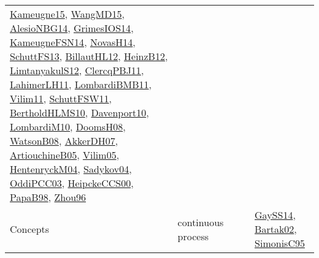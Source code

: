 {\begin{longtable}{llp{6cm}p{6cm}p{6cm}}
\href{articles/Kameugne15.pdf}{Kameugne15}\cite{Kameugne15}, \href{articles/WangMD15.pdf}{WangMD15}\cite{WangMD15}, \href{papers/AlesioNBG14.pdf}{AlesioNBG14}\cite{AlesioNBG14}, \href{articles/GrimesIOS14.pdf}{GrimesIOS14}\cite{GrimesIOS14}, \href{articles/KameugneFSN14.pdf}{KameugneFSN14}\cite{KameugneFSN14}, \href{articles/NovasH14.pdf}{NovasH14}\cite{NovasH14}, \href{papers/SchuttFS13.pdf}{SchuttFS13}\cite{SchuttFS13}, \href{papers/BillautHL12.pdf}{BillautHL12}\cite{BillautHL12}, \href{papers/HeinzB12.pdf}{HeinzB12}\cite{HeinzB12}, \href{articles/LimtanyakulS12.pdf}{LimtanyakulS12}\cite{LimtanyakulS12}, \href{papers/ClercqPBJ11.pdf}{ClercqPBJ11}\cite{ClercqPBJ11}, \href{papers/LahimerLH11.pdf}{LahimerLH11}\cite{LahimerLH11}, \href{papers/LombardiBMB11.pdf}{LombardiBMB11}\cite{LombardiBMB11}, \href{papers/Vilim11.pdf}{Vilim11}\cite{Vilim11}, \href{articles/SchuttFSW11.pdf}{SchuttFSW11}\cite{SchuttFSW11}, \href{papers/BertholdHLMS10.pdf}{BertholdHLMS10}\cite{BertholdHLMS10}, \href{papers/Davenport10.pdf}{Davenport10}\cite{Davenport10}, \href{papers/LombardiM10.pdf}{LombardiM10}\cite{LombardiM10}, \href{papers/DoomsH08.pdf}{DoomsH08}\cite{DoomsH08}, \href{papers/WatsonB08.pdf}{WatsonB08}\cite{WatsonB08}, \href{papers/AkkerDH07.pdf}{AkkerDH07}\cite{AkkerDH07}, \href{papers/ArtiouchineB05.pdf}{ArtiouchineB05}\cite{ArtiouchineB05}, \href{papers/Vilim05.pdf}{Vilim05}\cite{Vilim05}, \href{papers/HentenryckM04.pdf}{HentenryckM04}\cite{HentenryckM04}, \href{papers/Sadykov04.pdf}{Sadykov04}\cite{Sadykov04}, \href{papers/OddiPCC03.pdf}{OddiPCC03}\cite{OddiPCC03}, \href{articles/HeipckeCCS00.pdf}{HeipckeCCS00}\cite{HeipckeCCS00}, \href{articles/PapaB98.pdf}{PapaB98}\cite{PapaB98}, \href{papers/Zhou96.pdf}{Zhou96}\cite{Zhou96}\\
Concepts & continuous process &  &  & \href{papers/GaySS14.pdf}{GaySS14}\cite{GaySS14}, \href{papers/Bartak02.pdf}{Bartak02}\cite{Bartak02}, \href{papers/SimonisC95.pdf}{SimonisC95}\cite{SimonisC95}\\

\end{longtable}}
